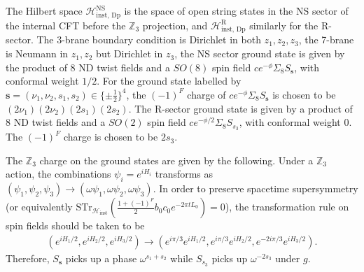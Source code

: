 \documentclass[12pt]{article}
\newcommand{\ie}{\begin{equation}\begin{aligned}}
\newcommand{\fe}{\end{aligned}\end{equation}}
\begin{document}
The Hilbert space $\mathcal{H}_\text{inst, Dp}^{\text{NS}}$ is the space of open string states in the NS sector of the internal CFT before the $\mathbb{Z}_3$ projection, and $\mathcal{H}_\text{inst, Dp}^{\text{R}}$ similarly for the R-sector. The 3-brane boundary condition is Dirichlet in both $z_1, z_2, z_3$, the 7-brane is Neumann in $z_1, z_2$ but Dirichlet in $z_3$, the NS sector ground state is given by the product of 8 ND twist fields and a $SO(8)$ spin field $ce^{-\phi}\Sigma_8 S_{\mathbf{s}}$, with conformal weight $1/2$. For the ground state labelled by $\mathbf{s}=(\nu_1,\nu_2,s_1,s_2)\in \{\pm \frac{1}{2}\}^4$, the $(-1)^F$ charge of $ce^{-\phi}\Sigma_8 S_{\mathbf{s}}$ is chosen to be $(2\nu_1)(2\nu_2)(2s_1)(2s_2)$. The R-sector ground state is given by a product of 8 ND twist fields and a $SO(2)$ spin field $ce^{-\phi/2}\Sigma_8 S_{s_3}$, with conformal weight $0$. The $(-1)^F$ charge is chosen to be $2s_3$.

The $\mathbb{Z}_3$ charge on the ground states are given by the following. Under a $\mathbb{Z}_3$ action, the combinations $\psi_i=e^{iH_i}$ transforms as $(\psi_1, \psi_2, \psi_3)\rightarrow (\omega \psi_1, \omega\psi_2, \omega\psi_3)$. In order to preserve spacetime supersymmetry (or equivalently $\mathrm{STr}_{\mathcal{H}_\text{inst}}(\frac{1+(-1)^F}{2}b_0c_0 e^{-2\pi t L_0})=0$), the transformation rule on spin fields should be taken to be
\ie
(e^{iH_1/2}, e^{iH_2/2}, e^{iH_3/2})\rightarrow (e^{i\pi/3} e^{iH_1/2}, e^{i\pi/3}e^{iH_2/2}, e^{-2i\pi/3}e^{iH_3/2}).
\fe
Therefore, $S_{\mathbf{s}}$ picks up a phase $\omega^{s_1+s_2}$ while $S_{s_3}$ picks up $\omega^{-2s_3}$ under $g$.
\end{document}
